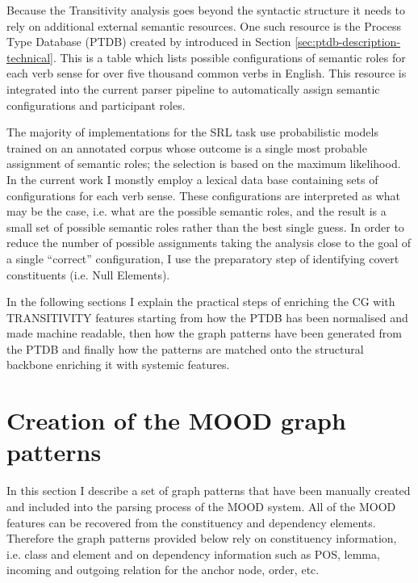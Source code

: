     Because the Transitivity analysis goes beyond the syntactic structure it needs to rely on additional external semantic resources. One such resource is the Process Type Database (PTDB) created by \citet{Neale2002} introduced in Section \ref{sec:ptdb-description-technical}. This is a table which lists possible configurations of semantic roles for each verb sense for over five thousand common verbs in English. This resource is integrated into the current parser pipeline to automatically assign semantic configurations and participant roles.


    The majority of implementations for the SRL task use probabilistic models trained on an annotated corpus whose outcome is a single most probable assignment of semantic roles; the selection is based on the maximum likelihood. In the current work I monstly employ a lexical data base containing sets of configurations for each verb sense. These configurations are interpreted as what may be the case, i.e. what are the possible semantic roles, and the result is a small set of possible semantic roles rather than the best single guess. In order to reduce the number of possible assignments taking the analysis close to the goal of a single ``correct'' configuration, I use the preparatory step of identifying covert constituents (i.e. Null Elements).

    In the following sections I explain the practical steps of enriching the CG with TRANSITIVITY features starting from how the PTDB has been normalised and made machine readable, then how the graph patterns have been generated from the PTDB and finally how the patterns are matched onto the structural backbone enriching it with systemic features.



\section{Creation of the MOOD graph patterns}
\label{sec:mood-patterns}
    In this section I describe a set of graph patterns that have been manually created and included into the parsing process of the MOOD system. All of the MOOD features can be recovered from the constituency and dependency elements. Therefore the graph patterns provided below rely on constituency information, i.e. class and element and on dependency information such as POS, lemma, incoming and outgoing relation for the anchor node, order, etc. 

